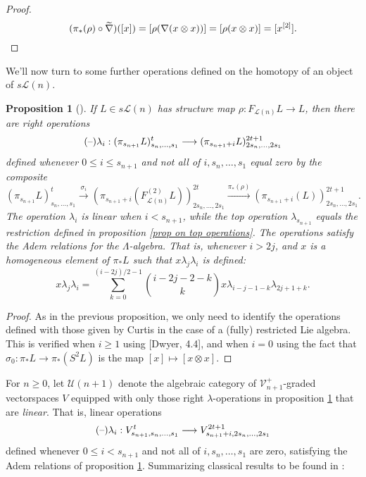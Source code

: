 \documentclass[11pt]{amsart}
\theoremstyle{plain}
\newtheorem{prop}[thm]{Proposition}
\theoremstyle{definition}
\newcommand{\DASH}{\textup{--}}
\renewcommand{\to}{\longrightarrow}
\newcommand{\calU}{\mathcal{U}}
\newcommand{\calL}{\mathcal{L}}
\newcommand{\calV}{\mathcal{V}}
\theoremstyle{plain}
\newcommand{\restn}[1]{#1^{[2]}}
\newcommand{\vect}[2]{\calV^{#1}_{#2}}
\begin{document}
\begin{Lie algebras in characteristic 2 and their homotopy operations}
\begin{proof}
\[(\pi_*(\rho)\circ\widetilde{\nabla})([x])=[\rho(\nabla(x\otimes x))]=[\rho(x\otimes x)]=[\restn{x}].\qedhere\]
\end{proof}
We'll now turn to some further operations defined on the homotopy of an object of $s\calL(n)$.
\begin{prop}[\cite{CurtisSimplicialHtpy.pdf,6Author.pdf}]\label{linear operations on homotopy of lie alg}
If $L\in s\calL(n)$ has structure map $\rho:F_{\calL(n)}L\to L$, then there are right operations
\[(\DASH)\lambda_i:(\pi_{s_{n+1}}L)_{s_n,\ldots,s_1}^t\to (\pi_{s_{n+1}+i}L)_{2s_n,\ldots,2s_1}^{2t+1}\]
defined whenever $0\leq i\leq s_{n+1}$ and not all of $i,s_n,\ldots,s_1$ equal zero by the composite
\[(\pi_{s_{n+1}}L)_{s_n,\ldots,s_1}^t\overset{\sigma_i}{\to}(\pi_{s_{n+1}+i}(F^{(2)}_{\calL(n)}L))_{2s_n,\ldots,2s_1}^{2t}\overset{\pi_*(\rho)}{\to}(\pi_{s_{n+1}+i}(L))_{2s_n,\ldots,2s_1}^{2t+1}.\]
The operation $\lambda_i$ is linear when $i<s_{n+1}$, while the top operation $\lambda_{s_{n+1}}$ equals the restriction defined in proposition \ref{prop on top operations}. The operations satisfy the Adem relations for the $\Lambda$-algebra. That is, whenever $i>2j$, and $x$ is a homogeneous element of $\pi_*L$ such that $x\lambda_j\lambda_i$ is defined:
\[x\lambda_j\lambda_i=\sum_{k=0}^{(i-2j)/2-1}{i-2j-2-k\choose k}x\lambda_{i-j-1-k}\lambda_{2j+1+k}.\]
\end{prop}
\begin{proof}
As in the previous proposition, we only need to identify the operations defined with those given by Curtis in the case of a (fully) restricted Lie algebra. This is verified when $i\geq1$ using [Dwyer, 4.4], and when $i=0$ using the fact that $\sigma_0:\pi_*L\to \pi_*(S^2L)$ is the map $[x]\mapsto[x\otimes x]$.
\end{proof}
For $n\geq0$, let $\calU(n+1)$ denote the algebraic category of $\vect{+}{n+1}$-graded vectorspaces $V$ equipped with only those right $\lambda$-operations in proposition \ref{linear operations on homotopy of lie alg} that are \emph{linear}. That is, linear operations 
\[(\DASH)\lambda_i:V_{s_{n+1},s_n,\ldots,s_1}^t\to V_{s_{n+1}+i,2s_n,\ldots,2s_1}^{2t+1}\]
defined whenever $0\leq i< s_{n+1}$ and not all of $i,s_{n},\ldots,s_{1}$ are zero, satisfying the Adem relations of proposition \ref{linear operations on homotopy of lie alg}. Summarizing classical results to be found in \cite{CurtisSimplicialHtpy.pdf}:


\end{Lie algebras in characteristic 2 and their homotopy operations}
\end{document}
